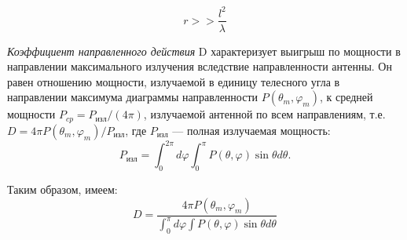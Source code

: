 \begin{equation}
    r>>\frac{l^2}{\lambda}
    \label{eq:1}
\end{equation}

\textit{Коэффициент направленного действия} D характеризует
выигрыш по  мощности в направлении максимального излучения вследствие направленности антенны. Он равен отношению 
мощности, излучаемой в единицу телесного угла в направлении максимума диаграммы направленности $P(\theta_m,\varphi_m)$, к средней 
мощности $P_{cp} = P_{\text{изл}} /(4\pi)$, излучаемой антенной по всем направлениям, т.е. $ D=4 \pi
P\left(\theta_{m}, \varphi_{m}\right) / P_{\text{изл}} $, где $P_{\text{изл}} $ — полная излучаемая мощность:
$$  P_{\text{изл}} = \int_0^{2\pi}d\varphi \int_0^\pi P( \theta,\varphi ) \sin{\theta}d \theta. $$

Таким образом, имеем:
\begin{equation}
    D=\frac{4 \pi P\left(\theta_{m}, \varphi_{m}\right)}{\int_{0}^{\pi} d \varphi \int P(\theta, \varphi) \sin \theta d \theta}
    \label{eq:2}    
\end{equation}

